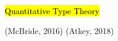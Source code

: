 \documentclass[xetex,aspectratio=169,14pt,hyperref={pdfpagelabels=true,pdflang={en-GB}}]{beamer}
\begin{document}



\newcommand{\point}{\textcolor{TitleRed}{$\rhd$}~}

\begin{frame}
  \begin{center}
    \hl{Quantitative Type Theory}

    \textcolor{black!60}{(McBride, 2016) (Atkey, 2018)}
  \end{center}
\end{frame}






\end{document}
